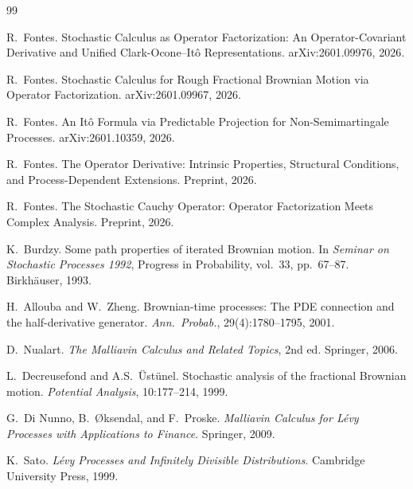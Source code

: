 \documentclass[11pt]{article}
\theoremstyle{definition}
\begin{document}
\begin{thebibliography}{99}

R.~Fontes.
\newblock Stochastic Calculus as Operator Factorization: An Operator-Covariant Derivative and Unified Clark-Ocone--It\^o Representations.
\newblock arXiv:2601.09976, 2026.

R.~Fontes.
\newblock Stochastic Calculus for Rough Fractional Brownian Motion via Operator Factorization.
\newblock arXiv:2601.09967, 2026.

R.~Fontes.
\newblock An It\^o Formula via Predictable Projection for Non-Semimartingale Processes.
\newblock arXiv:2601.10359, 2026.

R.~Fontes.
\newblock The Operator Derivative: Intrinsic Properties, Structural Conditions, and Process-Dependent Extensions.
\newblock Preprint, 2026.

R.~Fontes.
\newblock The Stochastic Cauchy Operator: Operator Factorization Meets Complex Analysis.
\newblock Preprint, 2026.

K.~Burdzy.
\newblock Some path properties of iterated {B}rownian motion.
\newblock In \emph{Seminar on Stochastic Processes 1992}, Progress in Probability, vol.~33, pp.~67--87. Birkh\"auser, 1993.

H.~Allouba and W.~Zheng.
\newblock Brownian-time processes: The {PDE} connection and the half-derivative generator.
\newblock \emph{Ann.\ Probab.}, 29(4):1780--1795, 2001.

D.~Nualart.
\newblock \emph{The Malliavin Calculus and Related Topics}, 2nd ed.
\newblock Springer, 2006.

L.~Decreusefond and A.S.~\"Ust\"unel.
\newblock Stochastic analysis of the fractional {B}rownian motion.
\newblock \emph{Potential Analysis}, 10:177--214, 1999.

G.~Di Nunno, B.~{\O}ksendal, and F.~Proske.
\newblock \emph{Malliavin Calculus for L\'evy Processes with Applications to Finance}.
\newblock Springer, 2009.

K.~Sato.
\newblock \emph{L\'evy Processes and Infinitely Divisible Distributions}.
\newblock Cambridge University Press, 1999.

\end{thebibliography}
\end{document}

